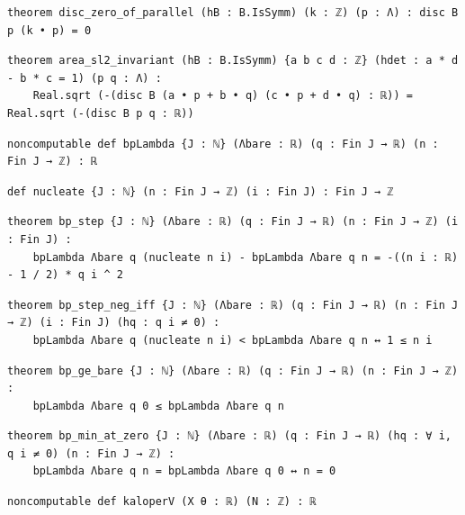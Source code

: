 \begin{lstlisting}[style=leancat]
theorem disc_zero_of_parallel (hB : B.IsSymm) (k : ℤ) (p : Λ) : disc B p (k • p) = 0
\end{lstlisting}

\begin{lstlisting}[style=leancat]
theorem area_sl2_invariant (hB : B.IsSymm) {a b c d : ℤ} (hdet : a * d - b * c = 1) (p q : Λ) :
    Real.sqrt (-(disc B (a • p + b • q) (c • p + d • q) : ℝ)) = Real.sqrt (-(disc B p q : ℝ))
\end{lstlisting}

\begin{lstlisting}[style=leancat]
noncomputable def bpLambda {J : ℕ} (Λbare : ℝ) (q : Fin J → ℝ) (n : Fin J → ℤ) : ℝ
\end{lstlisting}

\begin{lstlisting}[style=leancat]
def nucleate {J : ℕ} (n : Fin J → ℤ) (i : Fin J) : Fin J → ℤ
\end{lstlisting}

\begin{lstlisting}[style=leancat]
theorem bp_step {J : ℕ} (Λbare : ℝ) (q : Fin J → ℝ) (n : Fin J → ℤ) (i : Fin J) :
    bpLambda Λbare q (nucleate n i) - bpLambda Λbare q n = -((n i : ℝ) - 1 / 2) * q i ^ 2
\end{lstlisting}

\begin{lstlisting}[style=leancat]
theorem bp_step_neg_iff {J : ℕ} (Λbare : ℝ) (q : Fin J → ℝ) (n : Fin J → ℤ) (i : Fin J) (hq : q i ≠ 0) :
    bpLambda Λbare q (nucleate n i) < bpLambda Λbare q n ↔ 1 ≤ n i
\end{lstlisting}

\begin{lstlisting}[style=leancat]
theorem bp_ge_bare {J : ℕ} (Λbare : ℝ) (q : Fin J → ℝ) (n : Fin J → ℤ) :
    bpLambda Λbare q 0 ≤ bpLambda Λbare q n
\end{lstlisting}

\begin{lstlisting}[style=leancat]
theorem bp_min_at_zero {J : ℕ} (Λbare : ℝ) (q : Fin J → ℝ) (hq : ∀ i, q i ≠ 0) (n : Fin J → ℤ) :
    bpLambda Λbare q n = bpLambda Λbare q 0 ↔ n = 0
\end{lstlisting}

\begin{lstlisting}[style=leancat]
noncomputable def kaloperV (X θ : ℝ) (N : ℤ) : ℝ
\end{lstlisting}

